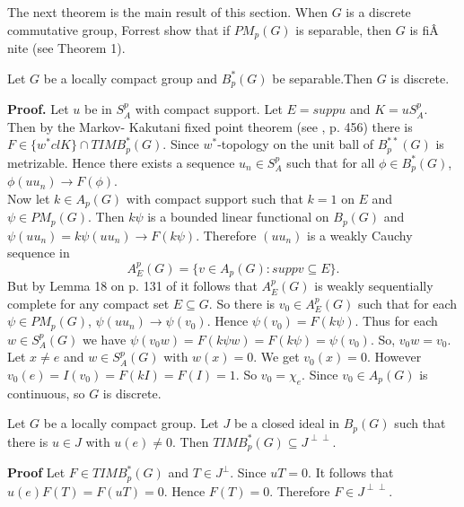 The next theorem is the main result of this section. When $G$ is a discrete commutative group, Forrest show that if $PM_p(G)$ is separable, then $G$ is fiÂnite (see \cite{4} Theorem 1).
\begin{theorem}
Let $G$ be a locally compact group and $B^*_p(G)$ be separable.Then $G$ is discrete.
\end{theorem}
{\bf Proof.} Let $u$ be in $S^p_A$ with compact support. Let $E = supp u$ and $K = uS^p_A$. Then by the Markov- Kakutani fixed point theorem (see \cite{2}, p. 456) there is $F\in \{w^*clK\}\cap TIMB^*_p(G)$. Since $w^*$-topology on the unit ball of $B^{**}_p(G)$ is metrizable. Hence there exists a sequence $u_n\in S^p_A$ such that for all $\phi\in B^*_p(G)$, $\phi(uu_n)\longrightarrow F(\phi)$. \\
\indent
Now let $k\in A_p(G)$ with compact support such that $k = 1$ on $E$ and $\psi\in PM_p(G)$.
Then $k\psi$ is a bounded linear functional on $B_p(G)$ and $\psi(uu_n) =k\psi (uu_n)\longrightarrow F(k\psi)$. Therefore $(uu_n)$ is a weakly Cauchy sequence in
$$A^p_E(G) = \{v\in A_p(G) : supp v\subseteq E\}.$$
But by Lemma 18 on p. 131 of \cite{5} it follows that $A^p_E(G)$ is weakly sequentially complete for any compact set $E\subseteq G$. So there is $v_0\in A^p_E(G)$ such that for each $\psi\in PM_p(G)$, $\psi(uu_n)\longrightarrow \psi(v_0)$. Hence $\psi(v_0) = F(k\psi)$. Thus for each $w\in S^p_A(G)$ we have $\psi(v_0w) = F(k\psi w) = F(k\psi) =\psi(v_0)$. So, $v_0w = v_0$. Let $x\not= e$ and $w\in S^p_A(G)$ with $w(x) = 0$. We get $v_0(x) = 0$. However $v_0(e)=I(v_0) = F(kI) = F(I) = 1$. So $v_0 = \chi_e$. Since $v_0\in A_p(G)$ is continuous, so $G$ is discrete.
\begin{theorem}
Let $G$ be a locally compact group. Let $J$ be a closed ideal in $B_p(G)$ such that there is $u\in J$ with $u(e)\not= 0$. Then $TIMB^*_p(G)\subseteq J^{\perp\perp}$.
\end{theorem}
{\bf Proof}
Let $F\in TIMB^*_p(G)$ and $T\in J^{\perp}$. Since $uT = 0$. It follows that $u(e)F(T) = F(uT)= 0$. Hence $F(T) = 0$. Therefore $F\in J^{\perp\perp}$.\\

